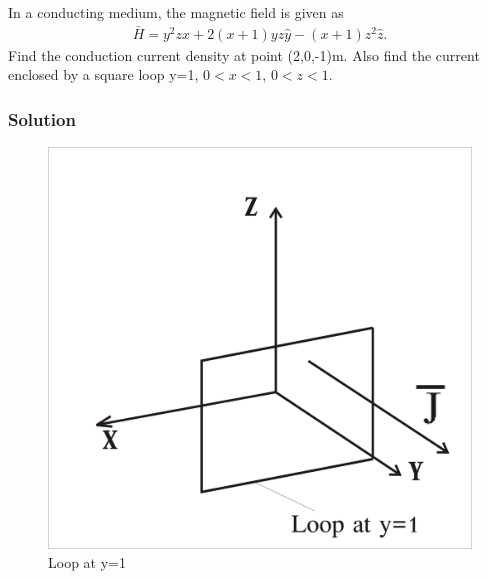 \begin{exmp}
	In a conducting medium, the magnetic field is given as
	\begin{align*}
			\bar{H}=y^{2}z\hat{x}+2(x+1)yz\hat{y}-(x+1)z^{2}\hat{z}.
		\end{align*}
	Find the conduction current density at point (2,0,-1)m. Also find the current enclosed by a square loop y=1, $0<x<1$, $0<z<1$.
	\subsubsection*{Solution}
	\begin{figure}[h]
			\centering
			\includegraphics[width=1\linewidth]{graphics/problem3b}
			\caption{Loop at y=1}
		\end{figure} 
	

\end{exmp}
